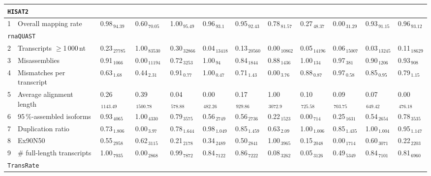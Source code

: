 \documentclass{scrartcl}
\begin{document}
\begin{landscape}
\begin{table}
\begin{scriptsize}
\begin{tabular}{llllllllllll}
\multicolumn{11}{l}{\texttt{HISAT2}}\\ 
\midrule
1 & Overall mapping rate  & 0.98$_{\,94.39}$ & 0.60$_{\,70.05}$ & 1.00$_{\,95.49}$ & 0.96$_{\,93.1}$ & 0.95$_{\,92.43}$ & 0.78$_{\,81.57}$ & 0.27$_{\,48.37}$ & 0.00$_{\,31.29}$ & 0.93$_{\,91.15}$ & 0.96$_{\,93.12}$ \\\midrule
\multicolumn{11}{l}{\texttt{rnaQUAST}}\\ 
\midrule
2 & Transcripts $\geq$1\,000\,nt  & 0.23$_{\,27785}$ & 1.00$_{\,83530}$ & 0.30$_{\,32866}$ & 0.04$_{\,13418}$ & 0.13$_{\,20560}$ & 0.00$_{\,10862}$ & 0.05$_{\,14196}$ & 0.06$_{\,15007}$ & 0.03$_{\,13245}$ & 0.11$_{\,18629}$ \\3 & Misassemblies  & 0.91$_{\,1066}$ & 0.00$_{\,11194}$ & 0.72$_{\,3253}$ & 1.00$_{\,94}$ & 0.84$_{\,1844}$ & 0.88$_{\,1436}$ & 1.00$_{\,134}$ & 0.97$_{\,381}$ & 0.90$_{\,1206}$ & 0.93$_{\,908}$ \\4 & Mismatches per transcript  & 0.63$_{\,1.68}$ & 0.44$_{\,2.31}$ & 0.91$_{\,0.77}$ & 1.00$_{\,0.47}$ & 0.71$_{\,1.43}$ & 0.00$_{\,3.76}$ & 0.88$_{\,0.87}$ & 0.97$_{\,0.58}$ & 0.85$_{\,0.95}$ & 0.79$_{\,1.15}$ \\5 & Average alignment length  & 0.26$_{\,1143.49}$ & 0.39$_{\,1500.78}$ & 0.04$_{\,578.88}$ & 0.00$_{\,482.26}$ & 0.17$_{\,929.86}$ & 1.00$_{\,3072.9}$ & 0.10$_{\,725.58}$ & 0.09$_{\,703.75}$ & 0.07$_{\,649.42}$ & 0.00$_{\,476.18}$ \\6 & 95\,\%-assembled isoforms  & 0.93$_{\,4065}$ & 1.00$_{\,4330}$ & 0.79$_{\,3575}$ & 0.56$_{\,2749}$ & 0.56$_{\,2736}$ & 0.22$_{\,1523}$ & 0.00$_{\,714}$ & 0.25$_{\,1631}$ & 0.54$_{\,2654}$ & 0.78$_{\,3535}$ \\7 & Duplication ratio  & 0.73$_{\,1.806}$ & 0.00$_{\,3.97}$ & 0.78$_{\,1.644}$ & 0.98$_{\,1.049}$ & 0.85$_{\,1.459}$ & 0.63$_{\,2.09}$ & 1.00$_{\,1.006}$ & 0.85$_{\,1.435}$ & 1.00$_{\,1.004}$ & 0.95$_{\,1.147}$ \\\midrule
8 & Ex90N50  & 0.55$_{\,2958}$ & 0.62$_{\,3115}$ & 0.21$_{\,2178}$ & 0.34$_{\,2489}$ & 0.50$_{\,2841}$ & 1.00$_{\,3965}$ & 0.15$_{\,2048}$ & 0.00$_{\,1714}$ & 0.60$_{\,3071}$ & 0.22$_{\,2203}$ \\9 & \# full-length transcripts  & 1.00$_{\,7935}$ & 0.00$_{\,2868}$ & 0.99$_{\,7872}$ & 0.84$_{\,7122}$ & 0.86$_{\,7222}$ & 0.08$_{\,3262}$ & 0.05$_{\,3126}$ & 0.49$_{\,5349}$ & 0.84$_{\,7101}$ & 0.81$_{\,6960}$ \\\midrule
\multicolumn{11}{l}{\texttt{TransRate}}\\ 
\midrule

\end{tabular}
\end{scriptsize}
\end{table}
\end{landscape}
\end{document}
